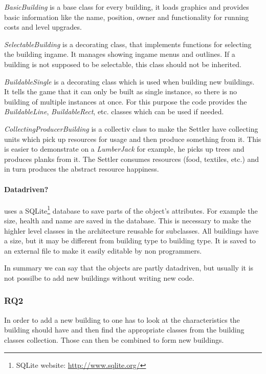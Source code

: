 \textit{BasicBuilding} is a base class for every building, it loads graphics and provides
basic information like the name, position, owner and functionality for running costs and level upgrades.

\textit{SelectableBuilding} is a decorating class, that implements functions for selecting the building ingame. It
manages showing ingame menus and outlines. If a building is not supposed to be selectable, this class should not be
inherited.

\textit{BuildableSingle} is a decorating class which is used when building new buildings. It tells the game that it can
only be built as single instance, so there is no building of multiple instances at once. For this purpose the code
provides the \textit{BuildableLine}, \textit{BuildableRect}, etc. classes which can be used if needed.

\textit{CollectingProducerBuilding} is a collectiv class to make the Settler have collecting units which pick up
resources for usage and then produce something from it. This is easier to demonstrate on a \textit{LumberJack} for
example, he picks up trees and produces planks from it. The Settler consumes resources (food, textiles, etc.) and in
turn produces the abstract resource happiness.

\paragraph{Datadriven?}
\UH{} uses a SQLite\footnote{SQLite website: \url{http://www.sqlite.org/}} database to save parts of the object's
attributes. For example the size, health and name are saved in the database. This is necessary to make the highler level
classes in the architecture reusable for subclasses. All buildings have a size, but it may be different from building
type to building type. It is saved to an external file to make it easily editable by non programmers.

In summary we can say that the objects are partly datadriven, but usually it is not possilbe to add new buildings
without writing new code.

\subsubsection{RQ2}
In order to add a new building to \UH{} one has to look at the characteristics the building should have and
then find the appropriate classes from the \UH{} building classes collection. Those can then be combined to
form new buildings.

